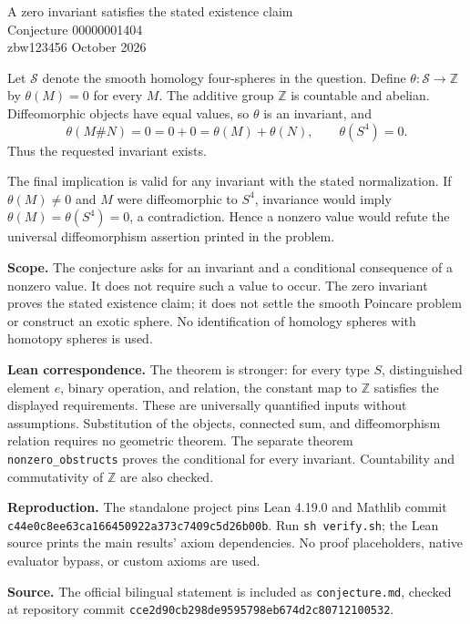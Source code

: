 \documentclass[11pt]{article}
\begin{document}
\begin{center}{\Large A zero invariant satisfies the stated existence claim}\\[6pt]
{\large Conjecture 00000001404}\\[5pt]
zbw123456  October 2026\end{center}

Let $\mathcal S$ denote the smooth homology four-spheres in the question.
Define $\theta:\mathcal S\to\mathbb Z$ by $\theta(M)=0$ for every $M$.
The additive group $\mathbb Z$ is countable and abelian.
Diffeomorphic objects have equal values, so $\theta$ is an invariant, and
\[
\theta(M\#N)=0=0+0=\theta(M)+\theta(N),\qquad \theta(S^4)=0.
\]
Thus the requested invariant exists.

The final implication is valid for any invariant with the stated normalization.
If $\theta(M)\ne0$ and $M$ were diffeomorphic to $S^4$, invariance would imply
$\theta(M)=\theta(S^4)=0$, a contradiction. Hence a nonzero value would refute
the universal diffeomorphism assertion printed in the problem.

\textbf{Scope.} The conjecture asks for an invariant and a conditional
consequence of a nonzero value. It does not require such a value to occur.
The zero invariant proves the stated existence claim; it does not settle
the smooth Poincare problem or construct an exotic sphere. No identification
of homology spheres with homotopy spheres is used.

\textbf{Lean correspondence.} The theorem is stronger: for every type $S$,
distinguished element $e$, binary operation, and relation, the constant map
to $\mathbb Z$ satisfies the displayed requirements. These are universally
quantified inputs without assumptions. Substitution of the objects,
connected sum, and diffeomorphism relation requires no geometric theorem.
The separate theorem \texttt{nonzero\_obstructs} proves the conditional for
every invariant. Countability and commutativity of $\mathbb Z$ are also checked.

\textbf{Reproduction.} The standalone project pins Lean 4.19.0 and Mathlib
commit \texttt{c44e0c8ee63ca166450922a373c7409c5d26b00b}.
Run \texttt{sh verify.sh}; the Lean source prints the main results'
axiom dependencies. No proof placeholders, native evaluator bypass, or
custom axioms are used.

\textbf{Source.} The official bilingual statement is included as
\texttt{conjecture.md}, checked at repository commit
\texttt{cce2d90cb298de9595798eb674d2c80712100532}.
\end{document}
